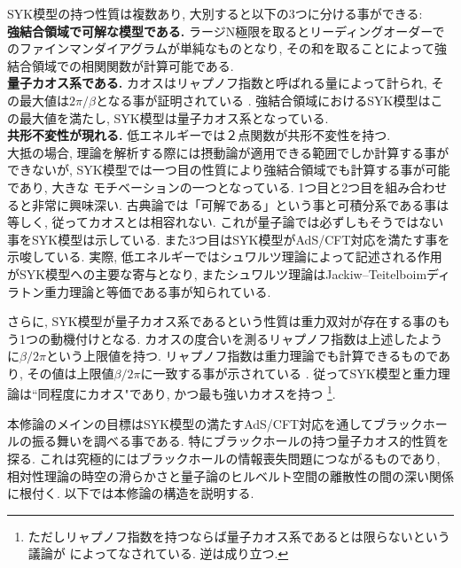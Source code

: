 SYK模型の持つ性質は複数あり, 大別すると以下の3つに分ける事ができる:\\

\textbf{強結合領域で可解な模型である.}
ラージN極限を取るとリーディングオーダーでのファインマンダイアグラムが単純なものとなり, 
その和を取ることによって強結合領域での相関関数が計算可能である. \\

\textbf{量子カオス系である.}
カオスはリャプノフ指数と呼ばれる量によって計られ, 
その最大値は$2\pi / \beta$となる事が証明されている \cite{shenker}. 
強結合領域におけるSYK模型はこの最大値を満たし\cite{maldacena}, 
SYK模型は量子カオス系となっている. \\

\textbf{共形不変性が現れる.}
低エネルギーでは２点関数が共形不変性を持つ. \\

大抵の場合, 理論を解析する際には摂動論が適用できる範囲でしか計算する事ができないが, 
SYK模型では一つ目の性質により強結合領域でも計算する事が可能であり, 大きな
モチベーションの一つとなっている. 
1つ目と2つ目を組み合わせると非常に興味深い. 
古典論では「可解である」という事と可積分系である事は等しく, 従ってカオスとは相容れない\cite{polchinski}. 
これが量子論では必ずしもそうではない事をSYK模型は示している. 
また3つ目はSYK模型がAdS/CFT対応を満たす事を示唆している. 
実際, 低エネルギーではシュワルツ理論によって記述される作用がSYK模型への主要な寄与となり, 
またシュワルツ理論はJackiw--Teitelboimディラトン重力理論と等価である事が知られている.

さらに, SYK模型が量子カオス系であるという性質は重力双対が存在する事のもう1つの動機付けとなる.
カオスの度合いを測るリャプノフ指数は上述したように$\beta / 2\pi$という上限値を持つ.
リャプノフ指数は重力理論でも計算できるものであり, その値は上限値$\beta / 2\pi$に一致する事が示されている
\cite{shenker}.
従ってSYK模型と重力理論は``同程度にカオス"であり, かつ最も強いカオスを持つ
\footnote{ただしリャプノフ指数を持つならば量子カオス系であるとは限らないという議論が\cite{eiki}
によってなされている. 逆は成り立つ.}. 


本修論のメインの目標はSYK模型の満たすAdS/CFT対応を通してブラックホールの振る舞いを調べる事である. 
特にブラックホールの持つ量子カオス的性質を探る. 
これは究極的にはブラックホールの情報喪失問題につながるものであり, 
相対性理論の時空の滑らかさと量子論のヒルベルト空間の離散性の間の深い関係に根付く\cite{stanford_chaos}. 
以下では本修論の構造を説明する. 

